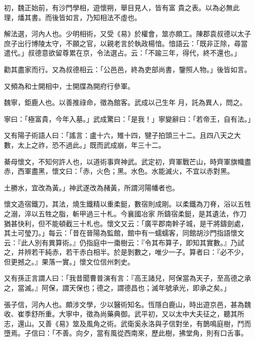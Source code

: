 \begin{pinyinscope}
 初，魏正始前，有沙門學相，遊懷朔，舉目見人，皆有富
 貴之表。以為必無此理，燔其書。而後皆如言，乃知相法不虛也。



 解法選，河內人也。少明相術，又受《易》於權會，筮亦頗工。陳郡袁叔德以太子庶子出行博陵太守，不願之官，以親老言於執政楊愔。愔語云：「既非正除，尋當遣代。」叔德意欲留尊累在京，令法選占。云：「不踰三年，得代，終不還也。」



 勸其盡家而行。又為叔德相云：「公邑邑，終為吏部尚書，鑒照人物。」後皆如言。



 又頻為和士開相中，士開牒為開府行參軍。



 魏寧，鉅鹿人也。以善推祿命，徵為館客。武成以己生年
 月，託為異人，問之。



 寧曰：「極富貴，今年入墓。」武成驚曰：「是我！」寧變辭曰：「若帝王，自有法。」



 又有陽子術語人曰：「謠言：盧十六，雉十四，犍子拍頭三十二。且四八天之大數，太上之祚，恐不過此。」既而武成崩，年三十二。



 綦母懷文，不知何許人也，以道術事齊神武。武定初，齊軍戰芒山，時齊軍旗幟盡赤，西軍盡黑，懷文曰：「赤，火色；黑。水色。水能滅火，不宜以赤對黑。



 土勝水，宜改為黃。」神武遂改為赭黃，所謂河陽幡者也。



 懷文造宿鐵刀，其法，燒生鐵精以重柔鋌，數宿則成剛。以柔鐵為刀脊，浴以五牲之溺，淬以五牲之脂，斬甲過三十札。今襄國冶家
 所鑄宿柔鋌，是其遺法，作刀猶甚快利，但不能頓截三十札也。懷文又云：「廣平郡南幹子城，是干將鑄劍處，其土可瑩刀。」每云：「昔在晉陽為監館，館中有一蠕蠕客，同館胡沙門指語懷文云：『此人別有異算術。』仍指庭中一棗樹云：『令其布算子，即知其實數。』乃試之，并辨若干純赤，若干赤白相半。於是剝數之，唯少一子。算者曰：『必不少，但更撼之。』果落一實。」懷文位信州刺史。



 又有孫正言謂人曰：「我昔聞曹普演有言：『高王諸兒，阿保當為天子，至高德之承之，當滅。』阿保，謂天保也；德之，謂德昌也；滅年號承光，即承之矣。」



 張子信，河內人也。頗涉文學，少以醫術知名。恆隱白鹿山，時出遊京邑，甚為魏收、崔季舒所重。大寧中，徵為尚藥典御。武平初，又以太中大夫征之，聽其所志，還山。又善《易》筮及風角之術。武衛奚永洛與子信對坐，有鵲鳴庭樹，鬥而墮焉。子信曰：「不善。向夕，當有風從西南來，歷此樹，拂堂角，則有口舌事。




\end{pinyinscope}
